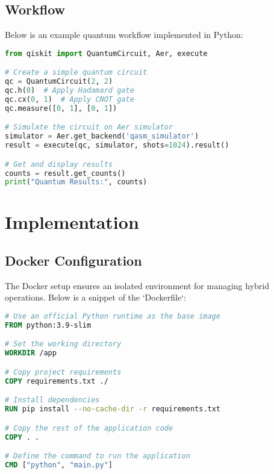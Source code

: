 \documentclass[12pt,a4paper]{article}
\begin{document}
\subsection{Workflow}
Below is an example quantum workflow implemented in Python:

\begin{tcolorbox}[title=Quantum Circuit Example]
\begin{lstlisting}[language=Python]
from qiskit import QuantumCircuit, Aer, execute

# Create a simple quantum circuit
qc = QuantumCircuit(2, 2)
qc.h(0)  # Apply Hadamard gate
qc.cx(0, 1)  # Apply CNOT gate
qc.measure([0, 1], [0, 1])

# Simulate the circuit on Aer simulator
simulator = Aer.get_backend('qasm_simulator')
result = execute(qc, simulator, shots=1024).result()

# Get and display results
counts = result.get_counts()
print("Quantum Results:", counts)
\end{lstlisting}
\end{tcolorbox}

\section{Implementation}
\subsection{Docker Configuration}
The Docker setup ensures an isolated environment for managing hybrid operations. Below is a snippet of the `Dockerfile`:

\begin{tcolorbox}[title=Dockerfile Example]
\begin{lstlisting}[language=Dockerfile]
# Use an official Python runtime as the base image
FROM python:3.9-slim

# Set the working directory
WORKDIR /app

# Copy project requirements
COPY requirements.txt ./

# Install dependencies
RUN pip install --no-cache-dir -r requirements.txt

# Copy the rest of the application code
COPY . .

# Define the command to run the application
CMD ["python", "main.py"]
\end{lstlisting}
\end{tcolorbox}

\end{document}
